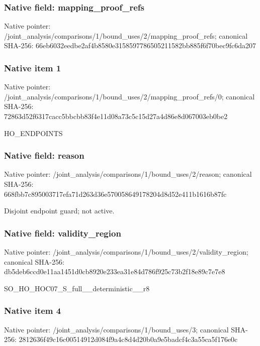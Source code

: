 \documentclass[10pt,a4paper]{article}
\begin{document}
\subsubsection{Native field: mapping\_\allowbreak{}proof\_\allowbreak{}refs}
Native pointer: /joint\_\allowbreak{}analysis/comparisons/1/bound\_\allowbreak{}uses/2/mapping\_\allowbreak{}proof\_\allowbreak{}refs; canonical SHA-256: 66eb6032eedbe2af4b8580e3158597786505211582bb885f6f70bec9fc6da207

\subsubsection{Native item 1}
Native pointer: /joint\_\allowbreak{}analysis/comparisons/1/bound\_\allowbreak{}uses/2/mapping\_\allowbreak{}proof\_\allowbreak{}refs/0; canonical SHA-256: 72863d52f6317cacc5bbcbb83f4e11d08a73c5c15d27a4d86e8d067003eb0be2

\begingroup\raggedright\sloppy HO\_\allowbreak{}ENDPOINTS\par\endgroup

\subsubsection{Native field: reason}
Native pointer: /joint\_\allowbreak{}analysis/comparisons/1/bound\_\allowbreak{}uses/2/reason; canonical SHA-256: 668fbb7c895003717efa71d263d36e570058649178204d8d52e411b1616b87fc

\begingroup\raggedright\sloppy Disjoint endpoint guard;\allowbreak{} not active.\par\endgroup

\subsubsection{Native field: validity\_\allowbreak{}region}
Native pointer: /joint\_\allowbreak{}analysis/comparisons/1/bound\_\allowbreak{}uses/2/validity\_\allowbreak{}region; canonical SHA-256: db5deb6ccd0e11aa1451d0cb8920e233ea31e84d786f925c73b2f18e89c7e7e8

\begingroup\raggedright\sloppy SO\_\allowbreak{}HO\_\allowbreak{}HOC07\_\allowbreak{}S\_\allowbreak{}full\_\allowbreak{}\_\allowbreak{}deterministic\_\allowbreak{}\_\allowbreak{}r8\par\endgroup

\subsubsection{Native item 4}
Native pointer: /joint\_\allowbreak{}analysis/comparisons/1/bound\_\allowbreak{}uses/3; canonical SHA-256: 2812636f49c16c00514912d084f9a4c8d4d20b0a9e5badcf4c3a55ca5f176e0c
\end{document}
